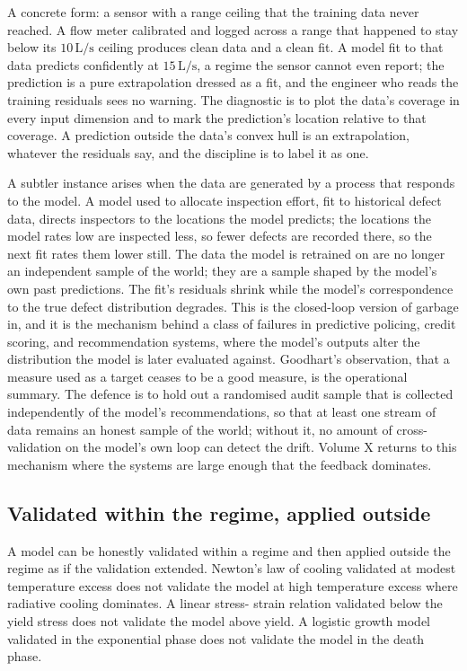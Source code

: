 A concrete form: a sensor with a range ceiling that the training data
never reached. A flow meter calibrated and logged across a range that
happened to stay below its $10\,\text{L/s}$ ceiling produces clean data
and a clean fit. A model fit to that data predicts confidently at
$15\,\text{L/s}$, a regime the sensor cannot even report; the prediction
is a pure extrapolation dressed as a fit, and the engineer who reads the
training residuals sees no warning. The diagnostic is to plot the data's
coverage in every input dimension and to mark the prediction's location
relative to that coverage. A prediction outside the data's convex hull
is an extrapolation, whatever the residuals say, and the discipline is
to label it as one.

\begin{mastery}
A subtler instance arises when the data are generated by a process that
responds to the model. A model used to allocate inspection effort, fit to
historical defect data, directs inspectors to the locations the model
predicts; the locations the model rates low are inspected less, so fewer
defects are recorded there, so the next fit rates them lower still. The
data the model is retrained on are no longer an independent sample of
the world; they are a sample shaped by the model's own past predictions.
The fit's residuals shrink while the model's correspondence to the true
defect distribution degrades. This is the closed-loop version of garbage
in, and it is the mechanism behind a class of failures in
predictive policing, credit scoring, and recommendation systems, where
the model's outputs alter the distribution the model is later evaluated
against. Goodhart's observation, that a measure used as a target ceases
to be a good measure, is the operational summary. The defence is to hold
out a randomised audit sample that is collected independently of the
model's recommendations, so that at least one stream of data remains an
honest sample of the world; without it, no amount of cross-validation on
the model's own loop can detect the drift. Volume X returns to this
mechanism where the systems are large enough that the feedback dominates.
\end{mastery}

\subsection{Validated within the regime, applied outside}

A model can be honestly validated within a regime and then
applied outside the regime as if the validation extended.
Newton's law of cooling validated at modest temperature
excess does not validate the model at high temperature
excess where radiative cooling dominates. A linear stress-
strain relation validated below the yield stress does not
validate the model above yield. A logistic growth model
validated in the exponential phase does not validate the
model in the death phase.

